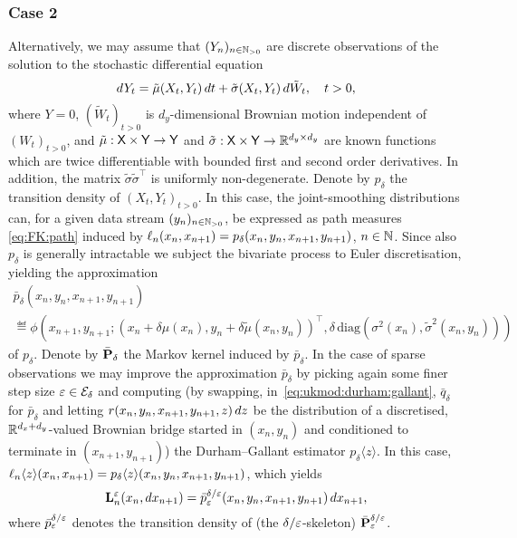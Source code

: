 \begin{example}
\subsubsection*{Case 2} Alternatively, we may assume that $(Y_n)_{n \in \mathbb{N}_{> 0}}$ are discrete observations of the solution to the stochastic differential equation 
$$
d Y_t = \tilde{\mu}(X_t, Y_t) \, d t + \tilde{\sigma}(X_t, Y_t) \, d \tilde{W}_t, \quad t > 0, 
$$
where $Y = 0$, $(\tilde{W}_t)_{t > 0}$ is $d_y$-dimensional Brownian motion independent of $(W_t)_{t > 0}$, and $\tilde{\mu} : \mathsf{X} \times \mathsf{Y} \to \mathsf{Y}$ and $\tilde{\sigma} : \mathsf{X} \times \mathsf{Y} \to \mathbb{R}^{d_y \times d_y}$ are known functions which are twice differentiable with bounded first and second order derivatives. In addition, the matrix $\tilde{\sigma} \tilde{\sigma}^\intercal$ is uniformly non-degenerate. Denote by $p_\delta$ the transition density of $(X_t, Y_t)_{t > 0}$. In this case, the joint-smoothing distributions can, for a given data stream $(y_n)_{n \in \mathbb{N}_{> 0}}$, be expressed as path measures \eqref{eq:FK:path} induced by $\ell_{n}(x_n, x_{n + 1}) = p_\delta(x_n, y_n, x_{n + 1}, y_{n + 1})$, $n \in \mathbb{N}$. Since also $p_\delta$ is generally intractable we subject the bivariate process to Euler discretisation, yielding the approximation 
\begin{multline}
\bar{p}_\delta(x_n, y_n, x_{n + 1}, y_{n + 1}) \\
\eqdef \phi \left( x_{n + 1}, y_{n + 1}; (x_n + \delta \mu(x_n), y_n + \delta \tilde{\mu}(x_n, y_n))^\intercal, \delta \, \mbox{diag}(\sigma^2(x_n), \tilde{\sigma}^2(x_n, y_n)) \right) \label{eq:td:bivariate:process}
\end{multline}
of $p_\delta$. Denote by $\bar{\mathbf{P}}_\delta$ the Markov kernel induced by $\bar{p}_\delta$. In the case of sparse observations we may improve the approximation $\bar{p}_\delta$ by picking again some finer step size $\varepsilon \in \mathcal{E}_\delta$ and computing (by swapping, in~\eqref{eq:ukmod:durham:gallant}, $\bar{q}_\delta$ for $\bar{p}_\delta$ and letting $r(x_n, y_n, x_{n + 1}, y_{n + 1}, z) \, d z$ be the distribution of a discretised, $\mathbb{R}^{d_x + d_y}$-valued Brownian bridge started in $(x_n, y_n)$ and conditioned to terminate in $(x_{n + 1}, y_{n + 1})$) the Durham--Gallant estimator $p_\delta \langle z \rangle$. In this case, $\ell_{n} \langle z \rangle(x_n, x_{n + 1}) = p_\delta \langle z \rangle (x_n, y_n, x_{n + 1}, y_{n + 1})$, which yields
\begin{equation} \label{eq:ukmod:durham:gallant:case:2}
\ukmod{n}(x_n, \rmd x_{n + 1}) = \bar{p}_\precpar^{\delta / \precpar}(x_n, y_n, x_{n + 1}, y_{n + 1}) \, \rmd x_{n + 1}, 
\end{equation}
where $\bar{p}_\varepsilon^{\delta / \varepsilon}$ denotes the transition density of (the $\delta / \varepsilon$-skeleton) $\bar{\mathbf{P}}_\varepsilon^{\delta / \varepsilon}$.  
\end{example}

